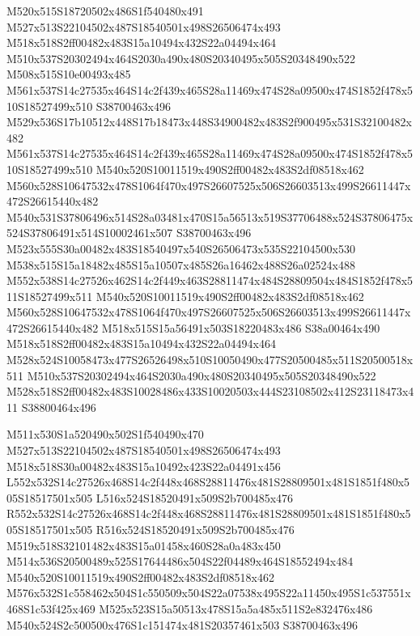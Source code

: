 \documentclass{article}
\begin{document}
\begin{multicols}{2}
M520x515S18720502x486S1f540480x491 M527x513S22104502x487S18540501x498S26506474x493 M518x518S2ff00482x483S15a10494x432S22a04494x464 M510x537S20302494x464S2030a490x480S20340495x505S20348490x522 M508x515S10e00493x485 M561x537S14c27535x464S14c2f439x465S28a11469x474S28a09500x474S1852f478x510S18527499x510 S38700463x496 M529x536S17b10512x448S17b18473x448S34900482x483S2f900495x531S32100482x482 M561x537S14c27535x464S14c2f439x465S28a11469x474S28a09500x474S1852f478x510S18527499x510 M540x520S10011519x490S2ff00482x483S2df08518x462 M560x528S10647532x478S1064f470x497S26607525x506S26603513x499S26611447x472S26615440x482 M540x531S37806496x514S28a03481x470S15a56513x519S37706488x524S37806475x524S37806491x514S10002461x507 S38700463x496 M523x555S30a00482x483S18540497x540S26506473x535S22104500x530 M538x515S15a18482x485S15a10507x485S26a16462x488S26a02524x488 M552x538S14c27526x462S14c2f449x463S28811474x484S28809504x484S1852f478x511S18527499x511 M540x520S10011519x490S2ff00482x483S2df08518x462 M560x528S10647532x478S1064f470x497S26607525x506S26603513x499S26611447x472S26615440x482 M518x515S15a56491x503S18220483x486 S38a00464x490 M518x518S2ff00482x483S15a10494x432S22a04494x464 M528x524S10058473x477S26526498x510S10050490x477S20500485x511S20500518x511 M510x537S20302494x464S2030a490x480S20340495x505S20348490x522 M528x518S2ff00482x483S10028486x433S10020503x444S23108502x412S23118473x411 S38800464x496

M511x530S1a520490x502S1f540490x470 M527x513S22104502x487S18540501x498S26506474x493 M518x518S30a00482x483S15a10492x423S22a04491x456 L552x532S14c27526x468S14c2f448x468S28811476x481S28809501x481S1851f480x505S18517501x505 L516x524S18520491x509S2b700485x476 R552x532S14c27526x468S14c2f448x468S28811476x481S28809501x481S1851f480x505S18517501x505 R516x524S18520491x509S2b700485x476 M519x518S32101482x483S15a01458x460S28a0a483x450 M514x536S20500489x525S17644486x504S22f04489x464S18552494x484 M540x520S10011519x490S2ff00482x483S2df08518x462 M576x532S1c558462x504S1c550509x504S22a07538x495S22a11450x495S1c537551x468S1c53f425x469 M525x523S15a50513x478S15a5a485x511S2e832476x486 M540x524S2c500500x476S1c151474x481S20357461x503 S38700463x496


\end{multicols}
\end{document}
